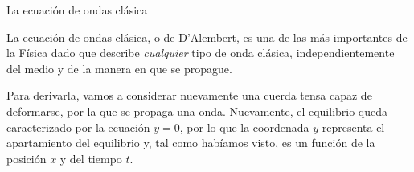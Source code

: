 \documentclass[11pt,handout,aspectratio=1610]{beamer}
\newcommand{\vs}{\vspace{11pt}}
\begin{document}
\begin{frame}{La ecuación de ondas clásica}

    La ecuación de ondas clásica, o de D'Alembert, es una de las más importantes de la Física dado que describe \emph{cualquier} tipo de onda clásica, independientemente del medio y de la manera en que se propague.

    \vs

    Para derivarla, vamos a considerar nuevamente una cuerda tensa capaz de deformarse, por la que se propaga una onda. Nuevamente, el equilibrio queda caracterizado por la ecuación $y=0$, por lo que la coordenada $y$ representa el apartamiento del equilibrio y, tal como habíamos visto, es un función de la posición $x$ y del tiempo $t$.
    
    \begin{figure}
        \centering
    \end{figure}

\end{frame}
\end{document}
